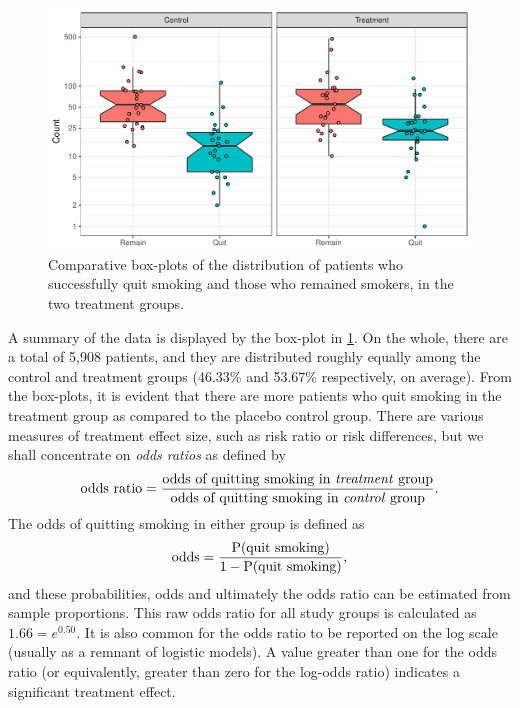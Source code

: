 \documentclass[a4paper,showframe,11pt]{report}\usepackage[]{graphicx}\usepackage[]{color}
\makeatletter
\def\maxwidth{ %
  \ifdim\Gin@nat@width>\linewidth
    \linewidth
  \else
    \Gin@nat@width
  \fi
}
\newenvironment{knitrout}{}{} %
\makeatother
\begin{document}
\begin{knitrout}
\color{fgcolor}\begin{figure}[htb]

{\centering \includegraphics[width=\maxwidth]{figure/05-plot_data_smoke-1} 

}

\caption[Comparative box-plots of the distribution of patients who successfully quit smoking and those who remained smokers, in the two treatment groups]{Comparative box-plots of the distribution of patients who successfully quit smoking and those who remained smokers, in the two treatment groups.}\label{fig:plot.data.smoke}
\end{figure}


\end{knitrout}
A summary of the data is displayed by the box-plot in \cref{fig:plot.data.smoke}.
On the whole, there are a total of 5,908
patients, and they are distributed roughly equally among the control and treatment groups (46.33\% and 53.67\% respectively, on average).
From the box-plots, it is evident that there are more patients who quit smoking in the treatment group as compared to the placebo control group.
There are various measures of treatment effect size, such as risk ratio or risk differences, but we shall concentrate on \emph{odds ratios} as defined by
\[
  \text{odds ratio} = \frac{\text{odds of quitting smoking in \emph{treatment} group}}
  {\text{odds of quitting smoking in \emph{control} group}}.
\]
The odds of quitting smoking in either group is defined as
\[
  \text{odds} = \frac{\operatorname{P}(\text{quit smoking})}{1 - \operatorname{P}(\text{quit smoking})},
\]
and these probabilities, odds and ultimately the odds ratio can be estimated from sample proportions.
This raw odds ratio for all study groups is calculated as $1.66 = e^{0.50}$.
It is also common for the odds ratio to be reported on the log scale (usually as a remnant of logistic models).
A value greater than one for the odds ratio (or equivalently, greater than zero for the log-odds ratio) indicates a significant treatment effect.
\end{document}
